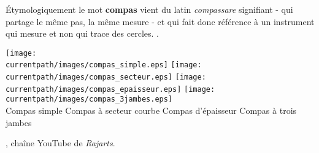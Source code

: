 \begin{changemargin}{-10mm}{-10mm}
\vspace*{-5mm}


\vfill

\begin{debat}
    Étymologiquement le mot {\bf compas} vient du latin {\it compassare} signifiant - qui partage le même pas, la même mesure - et qui fait donc référence à un instrument qui mesure et non qui trace des cercles.
    . \\
    \begin{center}
        \small
        \texttt{[image: \\currentpath/images/compas\_simple.eps]}
        \qquad
        \texttt{[image: \\currentpath/images/compas\_secteur.eps]}
        \qquad
        \texttt{[image: \\currentpath/images/compas\_epaisseur.eps]}
        \qquad
        \texttt{[image: \\currentpath/images/compas\_3jambes.eps]} \\
        Compas simple \quad Compas à secteur courbe \; Compas d'épaisseur \quad Compas à trois jambes
    \end{center}
    \vfill
    \begin{cadre}[B2][F4]
        \begin{center}
            , chaîne YouTube de {\it Rajarts}.      \end{center}
    \end{cadre}
\end{debat}
\end{changemargin}